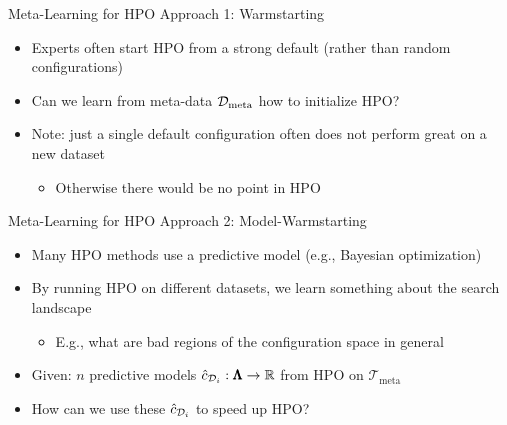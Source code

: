 \begin{frame}[c]{Meta-Learning for HPO Approach 1: Warmstarting}
	
\begin{itemize}
	\item Experts often start HPO from a strong default (rather than random configurations)
	\fhpause
	\medskip
	\item Can we learn from meta-data $\mathcal{D}_{\text{meta}}$ how to \alert{initialize} HPO?
	\fhpause
	\medskip
	\item Note: just a single default configuration often does not perform great on a new dataset
	\begin{itemize}
		\item Otherwise there would be no point in HPO
	\end{itemize}
\end{itemize}

\end{frame}
\begin{frame}[c]{Meta-Learning for HPO Approach 2: Model-Warmstarting}

\begin{itemize}
	\item Many HPO methods use a predictive model (e.g., Bayesian optimization)
	\medskip
	\item By running HPO on different datasets,
	we learn something about the search landscape
	\begin{itemize}
		\item E.g., what are bad regions of the configuration space in general
	\end{itemize}
	\bigskip
	\fhpause
	\item Given: $n$ predictive models $\hat{c}_{\mathcal{D}_i}: \pmb{\Lambda} \to \mathbb{R}$ from HPO on $\mathcal{T}_{\text{meta}}$	
	\item \alert{How can we use these $\hat{c}_{\mathcal{D}_i}$ to speed up HPO?}
\end{itemize}


\end{frame}

